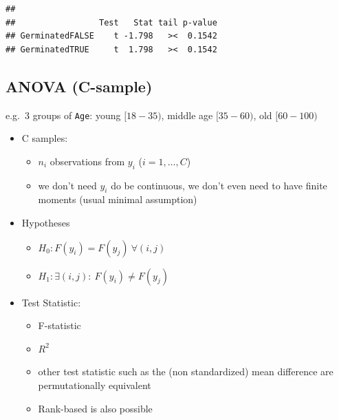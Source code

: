 \documentclass[
]{article}
\providecommand{\tightlist}{%
  \setlength{\itemsep}{0pt}\setlength{\parskip}{0pt}}
\begin{document}
\begin{verbatim}
## 
##                 Test   Stat tail p-value
## GerminatedFALSE    t -1.798   ><  0.1542
## GerminatedTRUE     t  1.798   ><  0.1542
\end{verbatim}

\hypertarget{anova-c-sample}{%
\subsection{ANOVA (C-sample)}\label{anova-c-sample}}

e.g.~3 groups of \texttt{Age}: young \([18-35)\), middle age
\([35-60)\), old \([60-100)\)

\begin{itemize}
\tightlist
\item
  C samples:

  \begin{itemize}
  \tightlist
  \item
    \(n_i\) observations from \(y_i\) (\(i=1,\ldots,C\))
  \item
    we don't need \(y_i\) do be continuous, we don't even need to have
    finite moments (usual minimal assumption)
  \end{itemize}
\item
  Hypotheses

  \begin{itemize}
  \tightlist
  \item
    \(H_0: F(y_i)=F(y_j)\ \forall (i,j)\)\\
  \item
    \(H_1: \exists (i,j): \ F(y_i)\neq F(y_j)\)
  \end{itemize}
\item
  Test Statistic:

  \begin{itemize}
  \tightlist
  \item
    F-statistic\\
  \item
    \(R^2\)\\
  \item
    other test statistic such as the (non standardized) mean difference
    are permutationally equivalent
  \item
    Rank-based is also possible
  \end{itemize}
\end{itemize}
\end{document}
